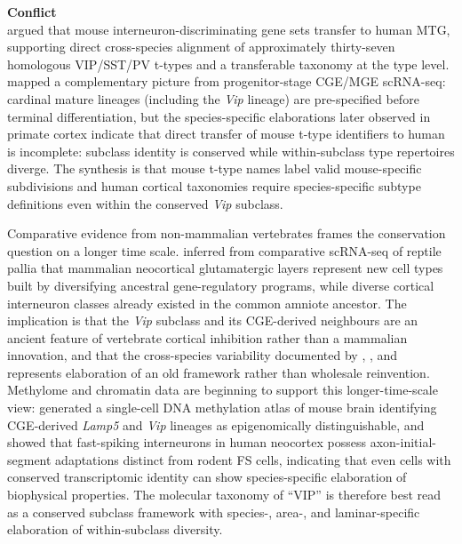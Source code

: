 \documentclass[11pt]{article}
\begin{document}
\begin{framed}
\textbf{Conflict}\\
\citet{Hodge2019} argued that mouse interneuron-discriminating gene sets transfer to human MTG, supporting direct cross-species alignment of approximately thirty-seven homologous VIP/SST/PV t-types and a transferable taxonomy at the type level. \citet{Mayer2018} mapped a complementary picture from progenitor-stage CGE/MGE scRNA-seq: cardinal mature lineages (including the \textit{Vip} lineage) are pre-specified before terminal differentiation, but the species-specific elaborations later observed in primate cortex \citep{Hodge2019, Boldog2018, Bakken2021a, Chartrand2023, Wei2022} indicate that direct transfer of mouse t-type identifiers to human is incomplete: subclass identity is conserved while within-subclass type repertoires diverge. The synthesis is that mouse t-type names label valid mouse-specific subdivisions and human cortical taxonomies require species-specific subtype definitions even within the conserved \textit{Vip} subclass.
\end{framed}

Comparative evidence from non-mammalian vertebrates frames the conservation question on a longer time scale. \citet{Tosches2018} inferred from comparative scRNA-seq of reptile pallia that mammalian neocortical glutamatergic layers represent new cell types built by diversifying ancestral gene-regulatory programs, while diverse cortical interneuron classes already existed in the common amniote ancestor. The implication is that the \textit{Vip} subclass and its CGE-derived neighbours are an ancient feature of vertebrate cortical inhibition rather than a mammalian innovation, and that the cross-species variability documented by \citet{Hodge2019}, \citet{Bakken2021a}, and \citet{Wei2022} represents elaboration of an old framework rather than wholesale reinvention. Methylome and chromatin data are beginning to support this longer-time-scale view: \citet{Liu2021} generated a single-cell DNA methylation atlas of mouse brain identifying CGE-derived \textit{Lamp5} and \textit{Vip} lineages as epigenomically distinguishable, and \citet{Bakos2025} showed that fast-spiking interneurons in human neocortex possess axon-initial-segment adaptations distinct from rodent FS cells, indicating that even cells with conserved transcriptomic identity can show species-specific elaboration of biophysical properties. The molecular taxonomy of ``VIP'' is therefore best read as a conserved subclass framework with species-, area-, and laminar-specific elaboration of within-subclass diversity.
\end{document}
